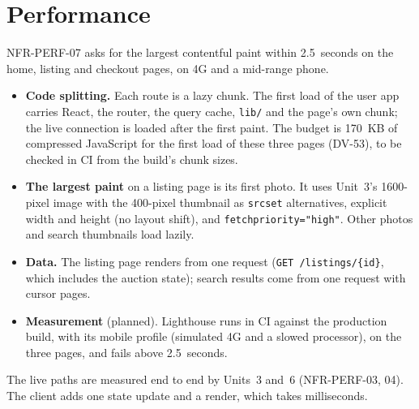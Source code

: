 \documentclass[11pt,a4paper]{article}
\begin{document}
\section{Performance}
\label{sec:perf}
NFR-PERF-07 asks for the largest contentful paint within 2.5~seconds on the home, listing and checkout pages, on 4G and a mid-range phone.
\begin{itemize}[nosep]
  \item \textbf{Code splitting.} Each route is a lazy chunk. The first load of the user app carries React, the router, the query cache, \texttt{lib/} and the page's own chunk; the live connection is loaded after the first paint. The budget is 170~KB of compressed JavaScript for the first load of these three pages (DV-53), to be checked in CI from the build's chunk sizes.
  \item \textbf{The largest paint} on a listing page is its first photo. It uses Unit~3's 1600-pixel image with the 400-pixel thumbnail as \texttt{srcset} alternatives, explicit width and height (no layout shift), and \texttt{fetchpriority="high"}. Other photos and search thumbnails load lazily.
  \item \textbf{Data.} The listing page renders from one request (\texttt{GET /listings/\{id\}}, which includes the auction state); search results come from one request with cursor pages.
  \item \textbf{Measurement} (planned). Lighthouse runs in CI against the production build, with its mobile profile (simulated 4G and a slowed processor), on the three pages, and fails above 2.5~seconds.
\end{itemize}
The live paths are measured end to end by Units~3 and~6 (NFR-PERF-03, 04). The client adds one state update and a render, which takes milliseconds.

\end{document}
